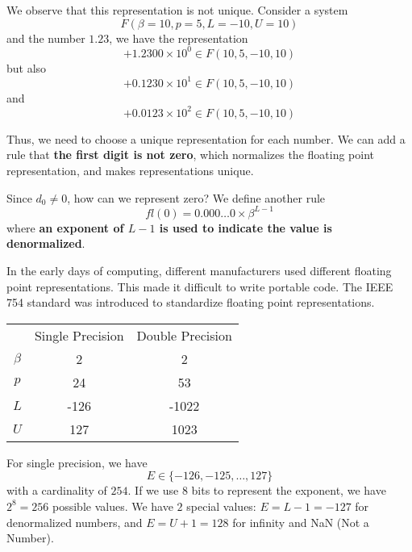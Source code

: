 \begin{remark}[\( d_0 \neq 0 \)]
    We observe that this representation is not unique. Consider a system \[
        F(\beta=10, p=5, L=-10, U=10)
    \] and the number \( 1.23 \), we have the representation \[
        + 1.2300 \times 10^0 \in F(10, 5, -10, 10)
    \] but also \[
        + 0.1230 \times 10^1 \in F(10, 5, -10, 10)
    \] and \[
        + 0.0123 \times 10^2 \in F(10, 5, -10, 10)
    \]

    Thus, we need to choose a unique representation for each number. We can add a rule that \textbf{the first digit is not zero}, which normalizes the floating point representation, and makes representations unique.
\end{remark}

\begin{remark}
    Since \( d_0 \neq 0 \), how can we represent zero? We define another rule \[
        fl(0) = 0.000\dots0 \times \beta^{L-1}
    \] where \textbf{an exponent of \( L-1 \) is used to indicate the value is denormalized}.
\end{remark}

In the early days of computing, different manufacturers used different floating point representations. This made it difficult to write portable code. The IEEE 754 standard \cite{8766229} was introduced to standardize floating point representations.

\begin{table}[H]
    \centering
    \begin{tabular}{ccc}
                    & Single Precision & Double Precision \\
        \( \beta \) & 2                & 2                \\
        \( p \)     & 24               & 53               \\
        \( L \)     & -126             & -1022            \\
        \( U \)     & 127              & 1023
    \end{tabular}
\end{table}

\begin{note}
    For single precision, we have \[
        E \in \{ -126, -125, \ldots, 127 \}
    \] with a cardinality of \( 254 \). If we use \( 8 \) bits to represent the exponent, we have \( 2^8 = 256 \) possible values. We have \( 2 \) special values: \( E = L - 1 = -127 \) for denormalized numbers, and \( E = U + 1 = 128 \) for infinity and NaN (Not a Number).
\end{note}

